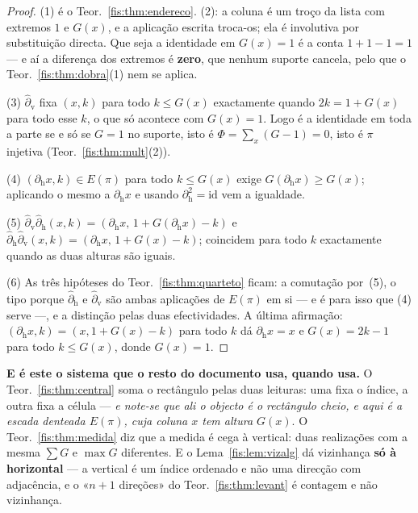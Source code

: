 \documentclass[livro.tex]{subfiles}
\begin{document}
\begin{proof}
(1) é o Teor.~\ref{fis:thm:endereco}. (2): a coluna é um troço da lista com
extremos $1$ e $G(x)$, e a aplicação escrita troca-os; ela é involutiva por
substituição directa. Que seja a identidade em $G(x)=1$ é a conta $1+1-1=1$ ---
e aí a diferença dos extremos é \textbf{zero}, que nenhum suporte cancela, pelo
que o Teor.~\ref{fis:thm:dobra}(1) nem se aplica.

(3) $\hat\partial_{\mathrm v}$ fixa $(x,k)$ para todo $k\le G(x)$ exactamente
quando $2k=1+G(x)$ para todo esse $k$, o que só acontece com $G(x)=1$. Logo é a
identidade em toda a parte se e só se $G=1$ no suporte, isto é
$\Phi=\sum_x(G-1)=0$, isto é $\pi$ injetiva (Teor.~\ref{fis:thm:mult}(2)).

(4) $(\partial_{\mathrm h}x,k)\in E(\pi)$ para todo $k\le G(x)$ exige
$G(\partial_{\mathrm h}x)\ge G(x)$; aplicando o mesmo a $\partial_{\mathrm h}x$ e
usando $\partial_{\mathrm h}^{2}=\mathrm{id}$ vem a igualdade.

(5) $\hat\partial_{\mathrm{v}}\hat\partial_{\mathrm{h}}(x,k)
=(\partial_{\mathrm{h}}x,\,1+G(\partial_{\mathrm{h}}x)-k)$ e
$\hat\partial_{\mathrm{h}}\hat\partial_{\mathrm{v}}(x,k)
=(\partial_{\mathrm{h}}x,\,1+G(x)-k)$; coincidem para todo $k$ exactamente quando
as duas alturas são iguais.

(6) As três hipóteses do Teor.~\ref{fis:thm:quarteto} ficam: a comutação por~(5),
o tipo porque $\hat\partial_{\mathrm h}$ e $\hat\partial_{\mathrm v}$ são ambas
aplicações de $E(\pi)$ em si --- e é para isso que (4) serve ---, e a distinção
pelas duas efectividades. A última afirmação: $(\partial_{\mathrm h}x,k)=(x,1+G(x)-k)$
para todo $k$ dá $\partial_{\mathrm h}x=x$ e $G(x)=2k-1$ para todo $k\le G(x)$,
donde $G(x)=1$.
\end{proof}


\medskip\noindent\textbf{E é este o sistema que o resto do documento usa, quando
usa.} O Teor.~\ref{fis:thm:central} soma o rectângulo pelas duas leituras: uma
fixa o índice, a outra fixa a célula --- \emph{e note-se que ali o objecto é o
rectângulo cheio, e aqui é a escada denteada $E(\pi)$, cuja coluna $x$ tem altura
$G(x)$}. O Teor.~\ref{fis:thm:medida} diz que a medida é cega à vertical: duas
realizações com a mesma $\sum G$ e $\max G$ diferentes. E o
Lema~\ref{fis:lem:vizalg} dá vizinhança \textbf{só à horizontal} --- a vertical é
um índice ordenado e não uma direcção com adjacência, e o «$n+1$ direções» do
Teor.~\ref{fis:thm:levant} é contagem e não vizinhança.
\end{document}

